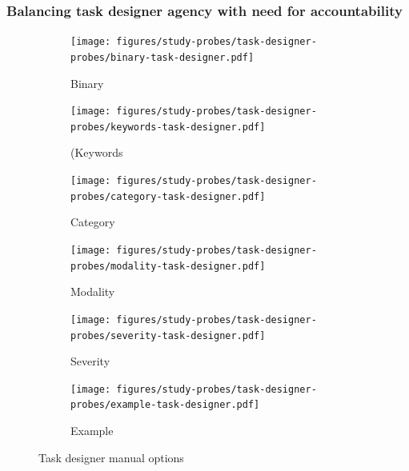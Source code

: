 \subsubsection{Balancing task designer agency with
need for accountability}
\begin{figure}[htbp]
    \centering

    \begin{subfigure}[b]{0.5\textwidth}
        \centering
        \texttt{[image: figures/study-probes/task-designer-probes/binary-task-designer.pdf]}
        \caption{Binary}
        \label{fig:manual-binary}
    \end{subfigure}
    \hfill
    \begin{subfigure}[b]{0.48\textwidth}
        \centering
        \texttt{[image: figures/study-probes/task-designer-probes/keywords-task-designer.pdf]}
        \caption{(Keywords}
        \label{fig:manual-keywords}
    \end{subfigure}

    \vspace{0.5em}

    \begin{subfigure}[b]{0.48\textwidth}
        \centering
        \texttt{[image: figures/study-probes/task-designer-probes/category-task-designer.pdf]}
        \caption{Category}
        \label{fig:manual-category}
    \end{subfigure}
    \hfill
    \begin{subfigure}[b]{0.48\textwidth}
        \centering
        \texttt{[image: figures/study-probes/task-designer-probes/modality-task-designer.pdf]}
        \caption{Modality}
        \label{fig:manual-modality}
    \end{subfigure}

    \vspace{0.5em}

    \begin{subfigure}[b]{0.48\textwidth}
        \centering
        \texttt{[image: figures/study-probes/task-designer-probes/severity-task-designer.pdf]}
        \caption{Severity}
        \label{fig:manual-severity}
    \end{subfigure}
    \hfill
    \begin{subfigure}[b]{0.48\textwidth}
        \centering
        \texttt{[image: figures/study-probes/task-designer-probes/example-task-designer.pdf]}
        \caption{Example}
        \label{fig:manual-example}
    \end{subfigure}
    \caption{Task designer manual options}
    \label{fig:task-designer-manual}
\end{figure}

